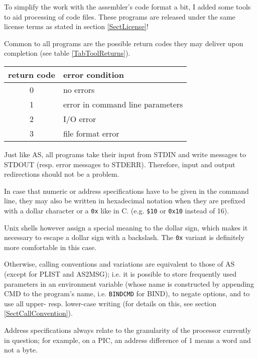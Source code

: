 \documentclass[12pt,twoside]{report}
\newcommand{\tty}[1]{{\tt #1}}
\begin{document}
To simplify the work with the assembler's code format a bit, I added
some tools to aid processing of code files.  These programs are
released under the same license terms as stated in section
\ref{SectLicense}!

Common to all programs are the possible return codes they may deliver
upon completion (see table \ref{TabToolReturns}).
\par
\begin{table*}[h]
\begin{center}\begin{tabular}{|c|l|}
\hline
return code   & error condition \\
\hline
\hline
0             & no errors \\
1             & error in command line parameters \\
2             & I/O error \\
3             & file format error \\
\hline
\end{tabular}\end{center}
\caption{Return Codes of the Utility Programs\label{TabToolReturns}}
\end{table*}
Just like AS, all programs take their input from STDIN and write
messages to STDOUT (resp. error messages to STDERR).  Therefore,
input and output redirections should not be a problem.

In case that numeric or address specifications have to be given in
the command line, they may also be written in hexadecimal notation
when they are prefixed with a dollar character or a \tty{0x} like in C.
(e.g. \verb!$10! or \verb!0x10! instead of 16).

Unix shells however  assign a special meaning to the
dollar sign, which makes it necessary to escape a dollar sign with a
backslash.  The \tty{0x} variant is definitely more comfortable in this case.

Otherwise, calling conventions and variations are equivalent to those
of AS (except for PLIST and AS2MSG); i.e. it is possible to store
frequently used parameters in an environment variable (whose name is
constructed by appending CMD to the program's name, i.e. \tty{BINDCMD} for
BIND), to negate options, and to use all upper- resp. lower-case
writing (for details on this, see section \ref{SectCallConvention}).

Address specifications always relate to the granularity of the
processor currently in question; for example, on a PIC, an address
difference of 1 means a word and not a byte.
\end{document}
